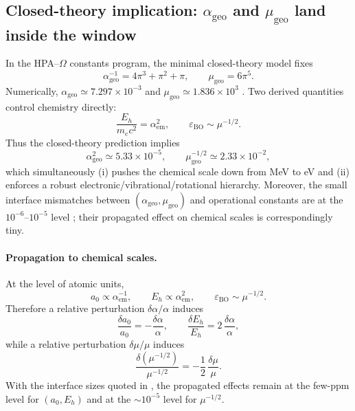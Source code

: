 \subsection{Closed-theory implication: \texorpdfstring{$\alpha_{\mathrm{geo}}$}{alpha\_geo} and \texorpdfstring{$\mu_{\mathrm{geo}}$}{mu\_geo} land inside the window}
In the HPA--$\Omega$ constants program, the minimal closed-theory model fixes
\[
\alpha_{\mathrm{geo}}^{-1}=4\pi^3+\pi^2+\pi,
\qquad
\mu_{\mathrm{geo}}=6\pi^5.
\]
Numerically, $\alpha_{\mathrm{geo}}\simeq 7.297\times 10^{-3}$ and $\mu_{\mathrm{geo}}\simeq 1.836\times 10^3$ \cite{Ma2025PCG}. Two derived quantities control chemistry directly:
\begin{equation}
\frac{E_h}{m_e c^2}=\alpha_{\mathrm{em}}^2,
\qquad
\varepsilon_{\mathrm{BO}}\sim \mu^{-1/2}.
\end{equation}
Thus the closed-theory prediction implies
\[
\alpha_{\mathrm{geo}}^2\simeq 5.33\times 10^{-5},
\qquad
\mu_{\mathrm{geo}}^{-1/2}\simeq 2.33\times 10^{-2},
\]
which simultaneously (i) pushes the chemical scale down from MeV to eV and (ii) enforces a robust electronic/vibrational/rotational hierarchy. Moreover, the small interface mismatches between $(\alpha_{\mathrm{geo}},\mu_{\mathrm{geo}})$ and operational constants are at the $10^{-6}$--$10^{-5}$ level \cite{Ma2025PCG,CODATA2022RMP}; their propagated effect on chemical scales is correspondingly tiny.

\paragraph{Propagation to chemical scales.}
At the level of atomic units,
\[
a_0\propto \alpha_{\mathrm{em}}^{-1},
\qquad
E_h\propto \alpha_{\mathrm{em}}^{2},
\qquad
\varepsilon_{\mathrm{BO}}\sim \mu^{-1/2}.
\]
Therefore a relative perturbation $\delta\alpha/\alpha$ induces
\[
\frac{\delta a_0}{a_0}=-\frac{\delta\alpha}{\alpha},
\qquad
\frac{\delta E_h}{E_h}=2\,\frac{\delta\alpha}{\alpha},
\]
while a relative perturbation $\delta\mu/\mu$ induces
\[
\frac{\delta(\mu^{-1/2})}{\mu^{-1/2}}=-\frac12\,\frac{\delta\mu}{\mu}.
\]
With the interface sizes quoted in \cite{Ma2025PCG}, the propagated effects remain at the few-ppm level for $(a_0,E_h)$ and at the $\sim 10^{-5}$ level for $\mu^{-1/2}$.


